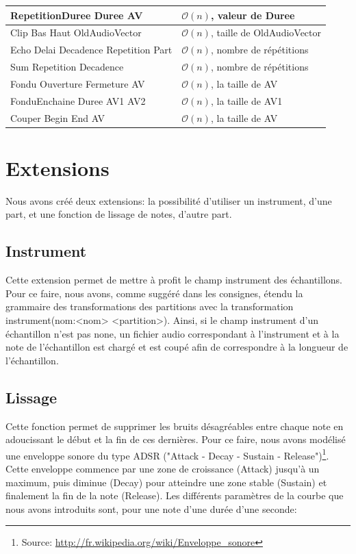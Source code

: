\documentclass[10pt,a4paper]{article}
\begin{document}
\begin{center}
\begin{tabular}{|l|l|}
		\hline
		RepetitionDuree Duree AV							& $\mathcal{O}(n)$, valeur de Duree										 \\
		\hline
		Clip Bas Haut OldAudioVector					& $\mathcal{O}(n)$, taille de OldAudioVector						 \\
		\hline
		Echo Delai Decadence Repetition Part	& $\mathcal{O}(n)$, nombre de répétitions							 \\
		\hline
		Sum Repetition Decadence							& $\mathcal{O}(n)$, nombre de répétitions						 \\
		\hline
		Fondu Ouverture Fermeture AV					& $\mathcal{O}(n)$, la taille de AV							 		\\
		\hline
		FonduEnchaine Duree AV1 AV2						& $\mathcal{O}(n)$,	la taille de AV1								 \\
		\hline
		Couper Begin End AV										& $\mathcal{O}(n)$, la taille de AV									 \\
		\hline
		\end{tabular}
\end{center}

\section{Extensions}
Nous avons créé deux extensions: la possibilité d'utiliser un instrument, d'une part, et une fonction de lissage de notes, d'autre part.

\subsection{Instrument}
Cette extension permet de mettre à profit le champ instrument des échantillons. Pour ce faire, 
nous avons, comme suggéré dans les consignes, étendu la grammaire des transformations des 
partitions avec la transformation instrument(nom:<nom> <partition>). 
Ainsi, si le champ instrument d'un échantillon n'est pas none, un fichier audio correspondant
à l'instrument et à la note de l'échantillon est chargé et est coupé afin de correspondre à la longueur de l'échantillon. 

\subsection{Lissage}
Cette fonction permet de supprimer les bruits désagréables entre chaque note en adoucissant 
le début et la fin de ces dernières. Pour ce faire, nous avons modélisé une enveloppe sonore 
du type ADSR ("Attack - Decay - Sustain - Release")\footnote{Source: \url{http://fr.wikipedia.org/wiki/Enveloppe_sonore}}.
Cette enveloppe commence par une zone de croissance (Attack) jusqu'à un maximum, puis diminue (Decay) pour atteindre 
une zone stable (Sustain) et finalement la fin de la note (Release). Les différents paramètres de la courbe que 
nous avons introduits sont, pour une note d'une durée d'une seconde: 
\end{document}
